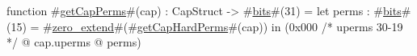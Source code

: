 function #\hyperref[zgetCapPerms]{getCapPerms}#(cap) : CapStruct -> #\hyperref[zbits]{bits}#(31) = 
    let perms : #\hyperref[zbits]{bits}#(15) = #\hyperref[zzzerozyextend]{zero\_extend}#(#\hyperref[zgetCapHardPerms]{getCapHardPerms}#(cap)) in
    (0x000 /* uperms 30-19 */
  @ cap.uperms
  @ perms)
